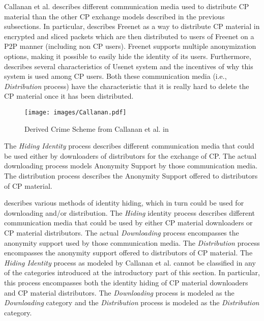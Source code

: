 \documentclass{sig-alternate-br}
\begin{document}
Callanan et al. \cite{callanan2009internet} describes different communication media used to distribute CP material than the other CP exchange models described in the previous subsections. In particular, \cite{callanan2009internet} describes Freenet \cite{site:freenet} as a way to distribute CP material in encrypted and sliced packets which are then distributed to users of Freenet on a P2P manner (including non CP users). Freenet supports multiple anonymization options, making it possible to easily hide the identity of its users. Furthermore, \cite{callanan2009internet} describes several characteristics of Usenet system and the incentives of why this system is used among CP users. Both these communication media (i.e., \textit{Distribution} process) have the characteristic that it is really hard to delete the CP material once it has been distributed.

\begin{figure}[ht]
\centering
\texttt{[image: images/Callanan.pdf]}
\caption{Derived Crime Scheme from Callanan et al. in \cite{callanan2009internet}}
\label{fig:callanan_01}
\end{figure}

The \textit{Hiding Identity} process describes different communication media that could be used either by downloaders of distributors for the exchange of CP. The actual downloading process models Anonymity Support by those communication media. The distribution process describes the Anonymity Support offered to distributors of CP material.

\cite{callanan2009internet} describes various methods of identity hiding, which in turn could be used for downloading and/or distribution. The \textit{Hiding} identity process describes different communication media that could be used by either CP material downloaders or CP material distributors. The actual \textit{Downloading} process encompasses the anonymity support used by those communication media. The \textit{Distribution} process encompasses the anonymity support offered to distributors of CP material. The \textit{Hiding Identity} process as modeled by Callanan et al. cannot be classified in any of the categories introduced at the introductory part of this section. In particular, this process encompasses both the identity hiding of CP material downloaders and CP material distributors. The \textit{Downloading} process is modeled as the \textit{Downloading} category and the \textit{Distribution} process is modeled as the \textit{Distribution} category.
\end{document}
